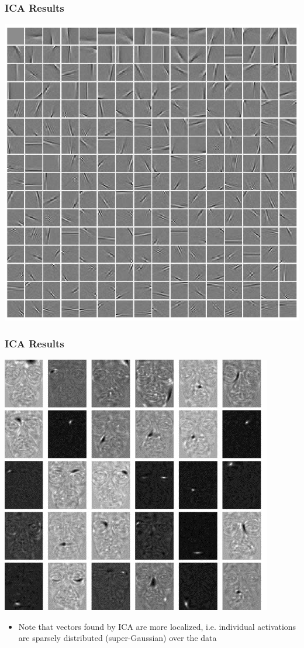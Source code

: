 \documentclass{beamer}
\begin{document}
\begin{frame}
\frametitle{ICA Results}  
\begin{center}
\includegraphics[scale = 0.3]{ICABasis.png}
\end{center} 
\end{frame} 

\begin{frame}
\frametitle{ICA Results}
\begin{center}
\includegraphics[scale = 0.5]{ICAfaces.jpg}
\end{center} 
\begin{itemize}
\item{Note that vectors found by ICA are more localized, i.e. individual activations are sparsely distributed (super-Gaussian) over the data}  
\end{itemize} 
\end{frame} 
\end{document}
